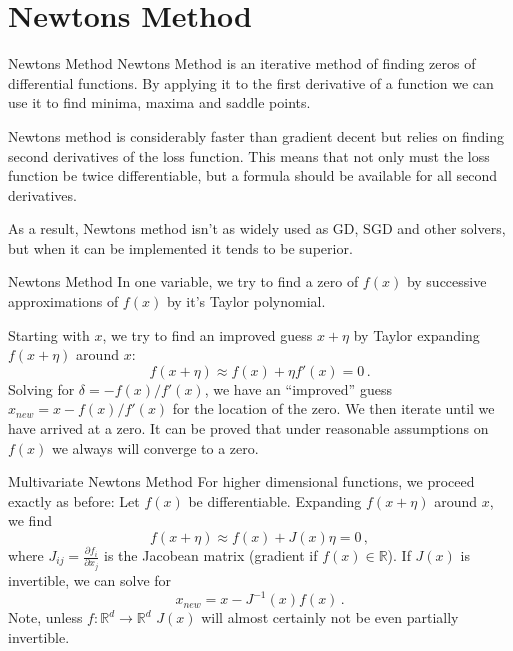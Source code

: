 \documentclass[10pt, table, dvipsnames,xcdraw, handout]{beamer}
\newcommand{\bR}{\ensuremath{\mathbb{R}}}
\begin{document}
\section{Newtons Method}


\begin{frame}[fragile]{Newtons Method}
Newtons Method is an iterative method of finding zeros of differential functions. By applying it to the first derivative of a function we can use it to find minima, maxima and saddle points. \pause

Newtons method is considerably faster than gradient decent but relies on finding second derivatives of the loss function. This means that not only must the loss function be twice differentiable, but a formula should be available for all second derivatives. \pause

As a result, Newtons method isn't as widely used as GD, SGD and other solvers, but when it can be implemented it tends to be superior. 
\end{frame}


\begin{frame}[fragile]{Newtons Method}
In one variable, we try to find a zero of $f(x)$ by successive approximations of $f(x)$ by it's Taylor polynomial. 

\pause Starting with $x$, we try to find an improved guess $x+\eta$ by Taylor expanding $f(x+\eta)$ around $x$:
$$
f(x+\eta) \approx f(x)+\eta f'(x) = 0\,.
$$\pause
Solving for $\delta =- f(x)/f'(x)$, we have an ``improved'' guess $x_{new} = x- f(x)/f'(x)$ for the location of the zero. \pause We then iterate until we have arrived at a zero. It can be proved that under reasonable assumptions on $f(x)$ we always will converge to a zero. 
\end{frame}



\begin{frame}[fragile]{Multivariate Newtons Method}
For higher dimensional functions, we proceed exactly as before: Let $f(x)$ be differentiable. Expanding $f( x +  \eta)$ around $ x$, we find
$$
f( x+\eta) \approx  f(x) + J(x) \eta = 0\,,
$$
where $J_{ij} = \frac{\partial f_i}{\partial x_j}$ is the Jacobean matrix (gradient if $f(x)\in \mathbb{R}$). \pause If $J(x)$ is invertible, we can solve for
$$
x_{new} =  x - J^{-1}( x) f(x) \,.
$$
Note, unless $f:\bR^d\to\bR^d$ $J(x)$ will almost certainly not be even partially invertible.
\end{frame}
\end{document}
